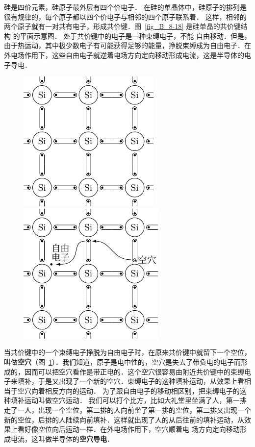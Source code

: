 硅是四价元素，硅原子最外层有四个价电子．
在硅的单晶体中，硅原子的排列是很有规律的，每个原子都以四个价电子与相邻的四个原子联系着．
这样，相邻的两个原子就有一对共有电子，形成共价键．图~\ref{fig_B_8-18} 是硅单晶的共价键结构
的平面示意图．
处于共价键中的电子是一种束缚电子，不能
自由移动．但是，由于热运动，其中极少数电子有可能获得足够的能量，挣脱束缚成为自由电子．在外电场作用下，这些自由电子就逆着电场方向定向移动形成电流，这是半导体的电子导电．
\begin{figure}[htbp]
    \centering
    \begin{minipage}[t]{0.48\textwidth}
        \centering
        \includegraphics{fig/B/8-18.pdf}
        \caption{}\label{fig_B_8-18}
    \end{minipage}
    \begin{minipage}[t]{0.48\textwidth}
        \centering
        \includegraphics{fig/B/8-19.pdf}
        \caption{}\label{fig_B_8-19}
    \end{minipage}
\end{figure}

当共价键中的一个束缚电子挣脱为自由电子时，在原来共价键中就留下一个空位，叫做\textbf{空穴}（图~\ref{fig_B_8-19}）．我们知道，原子是电中性的，空穴是失去了带负电的电子而形成的，因而可以把空穴看作是带正电的．这个空穴很容易由附近共价键中的束缚电子来填补，于是又出现了一个新的空穴．束缚电子的这种填补运动，从效果上看相当于空穴向着相反方向的运动．
为了跟自由电子的移动相区别，把束缚电子的这种填补运动叫做空穴运动．
我们可以打个比方，比如大礼堂里坐满了人，第一排走了一人，出现一个空位，第二排的人向前坐了第一排的空位，第二排又出现一个新的空位，后排的人陆续向前填补．这样就出现了人的从后往前的填补运动，从效果上看好像空位向后运动一样．在外电场作用下，空穴顺着电
场方向定向移动形成电流，这叫做半导体的\textbf{空穴导电}．

